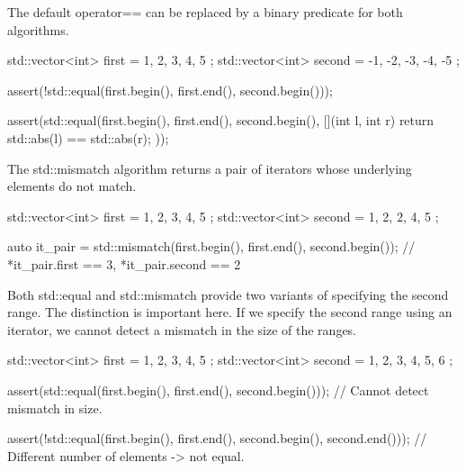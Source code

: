 
The default operator== can be replaced by a binary predicate for both algorithms.

\begin{box-note}
\begin{cppcode}
std::vector<int> first = { 1, 2, 3, 4, 5 };
std::vector<int> second = { -1, -2, -3, -4, -5 };

assert(!std::equal(first.begin(), first.end(), second.begin()));

assert(std::equal(first.begin(), first.end(), second.begin(), 
                  [](int l, int r) { return std::abs(l) == std::abs(r); }));
\end{cppcode}
\end{box-note}

The std::mismatch algorithm returns a pair of iterators whose underlying elements do not match.

\begin{box-note}
\begin{cppcode}
std::vector<int> first = { 1, 2, 3, 4, 5 };
std::vector<int> second = { 1, 2, 2, 4, 5 };

auto it_pair = std::mismatch(first.begin(), first.end(), second.begin());
// *it_pair.first == 3, *it_pair.second == 2
\end{cppcode}
\end{box-note}

Both std::equal and std::mismatch provide two variants of specifying the second range. The distinction is important here. If we specify the second range using an iterator, we cannot detect a mismatch in the size of the ranges.

\begin{box-note}
\begin{cppcode}
std::vector<int> first = { 1, 2, 3, 4, 5 };
std::vector<int> second = { 1, 2, 3, 4, 5, 6 };

assert(std::equal(first.begin(), first.end(), 
                  second.begin()));
// Cannot detect mismatch in size.

assert(!std::equal(first.begin(), first.end(), 
                   second.begin(), second.end()));
// Different number of elements -> not equal.
\end{cppcode}
\end{box-note}